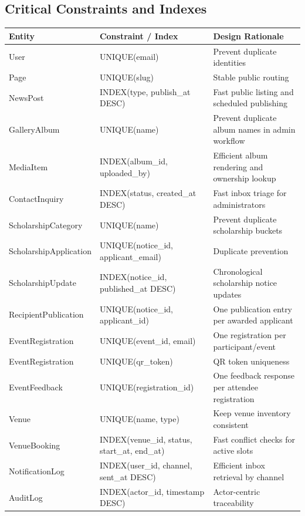 \documentclass[12pt,a4paper]{article}
\newcommand{\thead}[1]{\textbf{\color{white}#1}}
\newcommand{\theadrow}{\rowcolor{headerblue}}
\begin{document}
\subsection{Critical Constraints and Indexes}
\begin{longtable}{@{}L{4.2cm}L{5.5cm}L{5.2cm}@{}}
\theadrow \thead{Entity} & \thead{Constraint / Index} & \thead{Design Rationale} \\
\endhead
User & UNIQUE(email) & Prevent duplicate identities \\
Page & UNIQUE(slug) & Stable public routing \\
NewsPost & INDEX(type, publish\_at DESC) & Fast public listing and scheduled publishing \\
GalleryAlbum & UNIQUE(name) & Prevent duplicate album names in admin workflow \\
MediaItem & INDEX(album\_id, uploaded\_by) & Efficient album rendering and ownership lookup \\
ContactInquiry & INDEX(status, created\_at DESC) & Fast inbox triage for administrators \\
ScholarshipCategory & UNIQUE(name) & Prevent duplicate scholarship buckets \\
ScholarshipApplication & UNIQUE(notice\_id, applicant\_email) & Duplicate prevention \\
ScholarshipUpdate & INDEX(notice\_id, published\_at DESC) & Chronological scholarship notice updates \\
RecipientPublication & UNIQUE(notice\_id, applicant\_id) & One publication entry per awarded applicant \\
EventRegistration & UNIQUE(event\_id, email) & One registration per participant/event \\
EventRegistration & UNIQUE(qr\_token) & QR token uniqueness \\
EventFeedback & UNIQUE(registration\_id) & One feedback response per attendee registration \\
Venue & UNIQUE(name, type) & Keep venue inventory consistent \\
VenueBooking & INDEX(venue\_id, status, start\_at, end\_at) & Fast conflict checks for active slots \\
NotificationLog & INDEX(user\_id, channel, sent\_at DESC) & Efficient inbox retrieval by channel \\
AuditLog & INDEX(actor\_id, timestamp DESC) & Actor-centric traceability \\
\bottomrule
\end{longtable}
\end{document}
